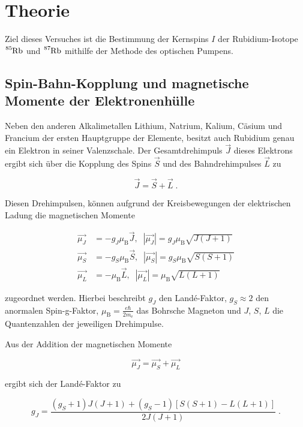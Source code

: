 \section{Theorie}
\label{sec:Theorie}

Ziel dieses Versuches ist die Bestimmung der Kernspins $I$ der Rubidium-Isotope $\ce{^{85}Rb}$ und $\ce{^{87}Rb}$
mithilfe der Methode des optischen Pumpens.

\subsection{Spin-Bahn-Kopplung und magnetische Momente der Elektronenhülle}

Neben den anderen Alkalimetallen Lithium, Natrium, Kalium, Cäsium und Francium der ersten Hauptgruppe der Elemente,
besitzt auch Rubidium genau ein Elektron in seiner Valenzschale.
Der Gesamtdrehimpuls $\vec{J}$ dieses Elektrons ergibt sich über die Kopplung des Spins $\vec{S}$ und des Bahndrehimpulses
$\vec{L}$ zu

\begin{equation}
    \vec{J} = \vec{S} + \vec{L} \; .
\end{equation}

Diesen Drehimpulsen, können aufgrund der Kreisbewegungen der elektrischen Ladung die magnetischen Momente

\begin{align}
    \vec{\mu_J} &= - g_J \mu_\text{B} \vec{J}, \; \; |\vec{\mu_J}| = g_J \mu_\text{B} \sqrt{J(J+1)} \\
    \vec{\mu_S} &= - g_S \mu_\text{B} \vec{S}, \; \; |\vec{\mu_S}| = g_S \mu_\text{B} \sqrt{S(S+1)} \\
    \vec{\mu_L} &= - \mu_\text{B} \vec{L}, \; \; |\vec{\mu_L}| = \mu_\text{B} \sqrt{L(L+1)}
\end{align}

zugeordnet werden. Hierbei beschreibt $g_J$ den Land\'{e}-Faktor, $g_S\approx 2$ den anormalen Spin-g-Faktor, 
$\mu_\text{B} = \frac{e \hbar}{2 m_\text{e}}$ das
Bohrsche Magneton und $J$, $S$, $L$ die Quantenzahlen der jeweiligen Drehimpulse.

Aus der Addition der magnetischen Momente

\begin{equation}
    \vec{\mu_J} = \vec{\mu_S} + \vec{\mu_L}
\end{equation}

ergibt sich der Land\'{e}-Faktor zu

\begin{equation}
    g_J = \frac{(g_S + 1)J(J+1)+(g_S - 1)[S(S+1)-L(L+1)]}{2J(J+1)} \; .
\end{equation}

